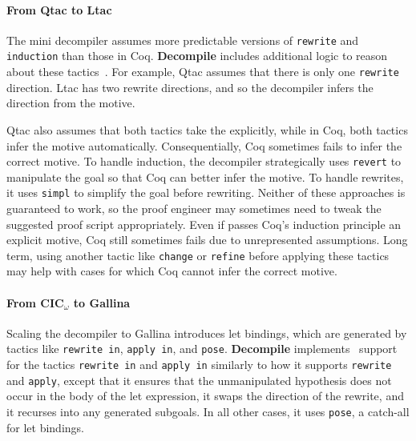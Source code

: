 \paragraph{From Qtac to Ltac}
The mini decompiler assumes more predictable versions of \lstinline{rewrite} and \lstinline{induction}
than those in Coq. \textbf{Decompile} includes additional logic to reason about these tactics~\href{https://github.com/uwplse/coq-plugin-lib/blob/9ef05815c261de9c99b604c6b581ba1c4fbc1a46/src/coq/decompiler/decompiler.ml}{}. %
For example, Qtac assumes that there is only one \lstinline{rewrite} direction. Ltac has two rewrite directions,
and so the decompiler infers the direction from the motive.

Qtac also assumes that both tactics take the  explicitly,
while in Coq, both tactics infer the motive automatically.
Consequentially, Coq sometimes fails to infer the correct motive.
To handle induction, the decompiler strategically uses \lstinline{revert} to manipulate the goal
so that Coq can better infer the motive.
To handle rewrites, it uses \lstinline{simpl} to simplify the goal before rewriting.
Neither of these approaches is guaranteed to work, so the proof engineer may sometimes need to tweak the 
suggested proof script appropriately.
Even if  passes Coq's induction principle an explicit motive, Coq still sometimes fails due
to unrepresented assumptions.
Long term, using another tactic like \lstinline{change} or \lstinline{refine} before applying these tactics
may help with cases for which Coq cannot infer the correct motive.

\paragraph{From CIC$_{\omega}$ to Gallina}
Scaling the decompiler to Gallina introduces let bindings, which are generated by 
tactics like \lstinline{rewrite in}, \lstinline{apply in}, and \lstinline{pose}.
\textbf{Decompile} implements~\href{https://github.com/uwplse/coq-plugin-lib/blob/9ef05815c261de9c99b604c6b581ba1c4fbc1a46/src/coq/decompiler/decompiler.ml}{} %
support for the tactics \lstinline{rewrite in} and \lstinline{apply in} similarly to how it supports
\lstinline{rewrite} and \lstinline{apply}, except that it ensures that the unmanipulated hypothesis does not occur in the body of the let expression,
it swaps the direction of the rewrite, and it recurses into any generated subgoals.
In all other cases, it uses \lstinline{pose}, a catch-all for let bindings.


